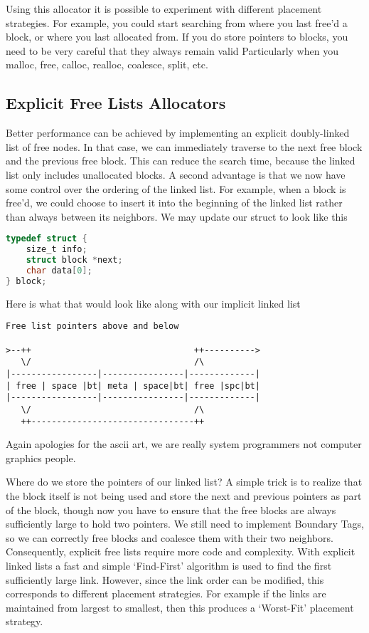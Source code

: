 Using this allocator it is possible to experiment with different placement strategies.
For example, you could start searching from where you last free'd a block, or where you last allocated from.
If you do store pointers to blocks, you need to be very careful that they always remain valid
Particularly when you malloc, free, calloc, realloc, coalesce, split, etc.

\subsection{Explicit Free Lists Allocators}

Better performance can be achieved by implementing an explicit doubly-linked list of free nodes.
In that case, we can immediately traverse to the next free block and the previous free block.
This can reduce the search time, because the linked list only includes unallocated blocks.
A second advantage is that we now have some control over the ordering of the linked list.
For example, when a block is free'd, we could choose to insert it into the beginning of the linked list rather than always between its neighbors.
We may update our struct to look like this

\begin{lstlisting}[language=C]
typedef struct {
    size_t info;
    struct block *next;
    char data[0];
} block;
\end{lstlisting}

Here is what that would look like along with our implicit linked list

\begin{verbatim}
Free list pointers above and below

>--++                                ++---------->
   \/                                /\
|-----------------|----------------|-------------|
| free | space |bt| meta | space|bt| free |spc|bt|
|-----------------|----------------|-------------|
   \/                                /\
   ++--------------------------------++
\end{verbatim}

Again apologies for the ascii art, we are really system programmers not computer graphics people.


Where do we store the pointers of our linked list?
A simple trick is to realize that the block itself is not being used and store the next and previous pointers as part of the block, though now you have to ensure that the free blocks are always sufficiently large to hold two pointers.
We still need to implement Boundary Tags, so we can correctly free blocks and coalesce them with their two neighbors.
Consequently, explicit free lists require more code and complexity.
With explicit linked lists a fast and simple `Find-First' algorithm is used to find the first sufficiently large link.
However, since the link order can be modified, this corresponds to different placement strategies.
For example if the links are maintained from largest to smallest, then this produces a `Worst-Fit' placement strategy.

